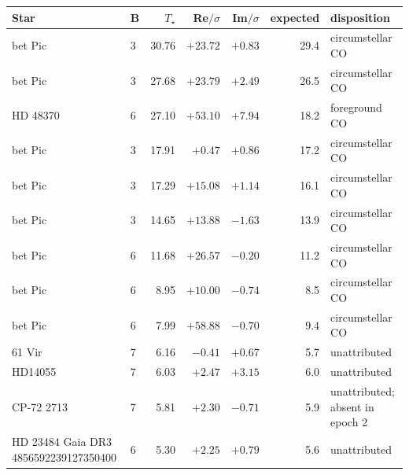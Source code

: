 \begin{tabular}{@{}llrrrrl@{}}
\toprule
Star & B & $T_\star$ & Re$/\sigma$ & Im$/\sigma$ & expected & disposition \\
\midrule
bet Pic & 3 & 30.76 & $+23.72$ & $+0.83$ & 29.4 & circumstellar CO \\
bet Pic & 3 & 27.68 & $+23.79$ & $+2.49$ & 26.5 & circumstellar CO \\
HD 48370 & 6 & 27.10 & $+53.10$ & $+7.94$ & 18.2 & foreground CO \\
bet Pic & 3 & 17.91 & $+0.47$ & $+0.86$ & 17.2 & circumstellar CO \\
bet Pic & 3 & 17.29 & $+15.08$ & $+1.14$ & 16.1 & circumstellar CO \\
bet Pic & 3 & 14.65 & $+13.88$ & $-1.63$ & 13.9 & circumstellar CO \\
bet Pic & 6 & 11.68 & $+26.57$ & $-0.20$ & 11.2 & circumstellar CO \\
bet Pic & 6 & 8.95 & $+10.00$ & $-0.74$ & 8.5 & circumstellar CO \\
bet Pic & 6 & 7.99 & $+58.88$ & $-0.70$ & 9.4 & circumstellar CO \\
61 Vir & 7 & 6.16 & $-0.41$ & $+0.67$ & 5.7 & unattributed \\
HD14055 & 7 & 6.03 & $+2.47$ & $+3.15$ & 6.0 & unattributed \\
CP-72 2713 & 7 & 5.81 & $+2.30$ & $-0.71$ & 5.9 & unattributed; absent in epoch 2 \\
HD 23484 Gaia DR3 4856592239127350400 & 6 & 5.30 & $+2.25$ & $+0.79$ & 5.6 & unattributed \\
\bottomrule
\end{tabular}

